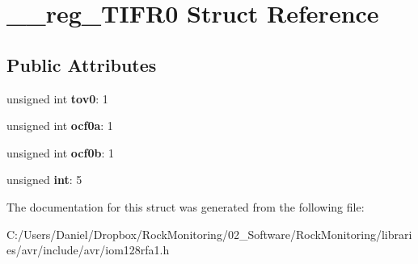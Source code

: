 \hypertarget{struct____reg___t_i_f_r0}{}\section{\+\_\+\+\_\+reg\+\_\+\+T\+I\+F\+R0 Struct Reference}
\label{struct____reg___t_i_f_r0}
\subsection*{Public Attributes}
\begin{DoxyCompactItemize}
\item 
unsigned int {\bfseries tov0}\+: 1\hypertarget{struct____reg___t_i_f_r0_a166b86aa8aacbc289b815090fa90066b}{}\label{struct____reg___t_i_f_r0_a166b86aa8aacbc289b815090fa90066b}

\item 
unsigned int {\bfseries ocf0a}\+: 1\hypertarget{struct____reg___t_i_f_r0_a2c96e30dfcdb130e6297f789acc5f356}{}\label{struct____reg___t_i_f_r0_a2c96e30dfcdb130e6297f789acc5f356}

\item 
unsigned int {\bfseries ocf0b}\+: 1\hypertarget{struct____reg___t_i_f_r0_a54195161ead14e1df00e974a3e8afb29}{}\label{struct____reg___t_i_f_r0_a54195161ead14e1df00e974a3e8afb29}

\item 
unsigned {\bfseries int}\+: 5\hypertarget{struct____reg___t_i_f_r0_a70b67fda600825076e1befcbb5fcce61}{}\label{struct____reg___t_i_f_r0_a70b67fda600825076e1befcbb5fcce61}

\end{DoxyCompactItemize}


The documentation for this struct was generated from the following file\+:\begin{DoxyCompactItemize}
\item 
C\+:/\+Users/\+Daniel/\+Dropbox/\+Rock\+Monitoring/02\+\_\+\+Software/\+Rock\+Monitoring/libraries/avr/include/avr/iom128rfa1.\+h\end{DoxyCompactItemize}
